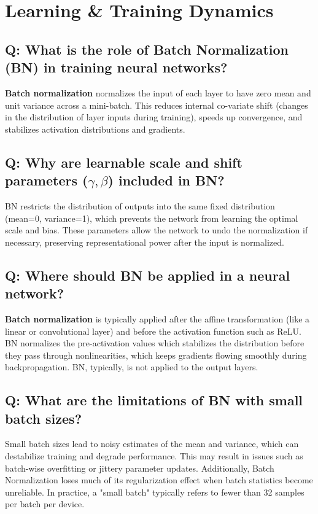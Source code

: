 \section{Learning \& Training Dynamics}

\subsection*{Q: What is the role of Batch Normalization (BN) in training neural networks?}
\textbf{Batch normalization} normalizes the input of each layer to have zero mean and unit variance across a mini-batch. This reduces internal co-variate shift (changes in the distribution of layer inputs during training), speeds up convergence, and stabilizes activation distributions and gradients.

\subsection*{Q: Why are learnable scale and shift parameters (\(\gamma, \beta\)) included in BN?}
BN restricts the distribution of outputs into the same fixed distribution (mean=0, variance=1), which prevents the network from learning the optimal scale and bias. These parameters allow the network to undo the normalization if necessary, preserving representational power after the input is normalized.

\subsection*{Q: Where should BN be applied in a neural network?}
\textbf{Batch normalization} is typically applied after the affine transformation (like a linear or convolutional layer) and before the activation function such as ReLU. BN normalizes the pre-activation values which stabilizes the distribution before they pass through nonlinearities, which keeps gradients flowing smoothly during backpropagation. BN, typically, is not applied to the output layers.

\subsection*{Q: What are the limitations of BN with small batch sizes?}
Small batch sizes lead to noisy estimates of the mean and variance, which can destabilize training and degrade performance. This may result in issues such as batch-wise overfitting or jittery parameter updates. Additionally, Batch Normalization loses much of its regularization effect when batch statistics become unreliable. In practice, a "small batch" typically refers to fewer than 32 samples per batch per device.

